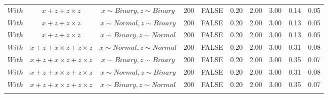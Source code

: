 \begin{longtable}{lccccccccc}
  $With$ & $\textit{x} + \textit{z} + \textit{z} \times \textit{z}$ & $\textit{x} \sim Binary, \textit{z} \sim Binary$ & 200 & FALSE & 0.20 & 2.00 & 3.00 & 0.14 & 0.05 \\ 
  $With$ & $\textit{x} + \textit{z} + \textit{z} \times \textit{z}$ & $\textit{x} \sim Normal, \textit{z} \sim Binary$ & 200 & FALSE & 0.20 & 2.00 & 3.00 & 0.13 & 0.05 \\ 
  $With$ & $\textit{x} + \textit{z} + \textit{z} \times \textit{z}$ & $\textit{x} \sim Binary, \textit{z} \sim Normal$ & 200 & FALSE & 0.20 & 2.00 & 3.00 & 0.13 & 0.05 \\ 
  $With$ & $\textit{x} + \textit{z} + \textit{x} \times \textit{z} + \textit{z} \times \textit{z}$ & $\textit{x} \sim Normal , \textit{z} \sim Normal$ & 200 & FALSE & 0.20 & 2.00 & 3.00 & 0.31 & 0.08 \\ 
  $With$ & $\textit{x} + \textit{z} + \textit{x} \times \textit{z} + \textit{z} \times \textit{z}$ & $\textit{x} \sim Binary, \textit{z} \sim Binary$ & 200 & FALSE & 0.20 & 2.00 & 3.00 & 0.35 & 0.07 \\ 
  $With$ & $\textit{x} + \textit{z} + \textit{x} \times \textit{z} + \textit{z} \times \textit{z}$ & $\textit{x} \sim Normal, \textit{z} \sim Binary$ & 200 & FALSE & 0.20 & 2.00 & 3.00 & 0.31 & 0.08 \\ 
  $With$ & $\textit{x} + \textit{z} + \textit{x} \times \textit{z} + \textit{z} \times \textit{z}$ & $\textit{x} \sim Binary, \textit{z} \sim Normal$ & 200 & FALSE & 0.20 & 2.00 & 3.00 & 0.35 & 0.07 \\ 
   \hline
\hline
\label{tab:apptab6}
\end{longtable}
